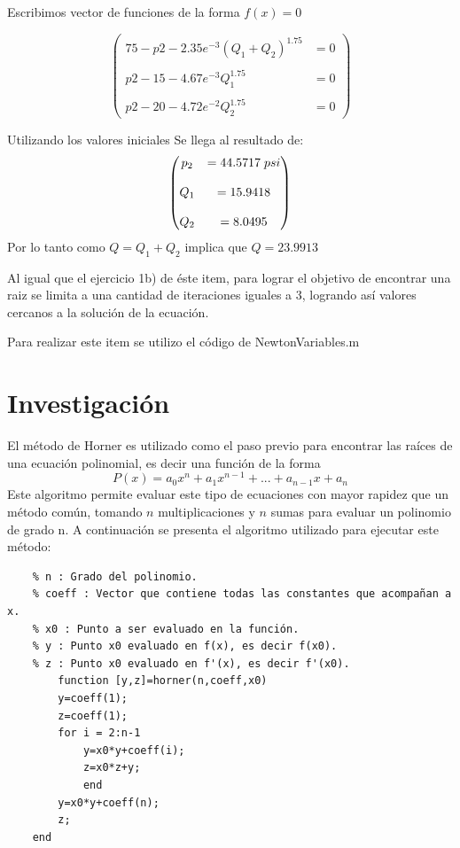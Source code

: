 \documentclass{udpreport}
\begin{document}
\begin{enumerate}
    Escribimos vector de funciones de la forma $f(x) = 0$

   $$\begin{pmatrix}
        75 - p2 - 2.35e^{-3}(Q_1+Q_2)^{1.75} &= 0 \\
        \\
        p2 - 15 - 4.67e^{-3}Q_1^{1.75} &= 0  \\
        \\
        p2 - 20 - 4.72e^{-2}Q_2^{1.75} &= 0
    \end{pmatrix}$$
    
    Utilizando los valores iniciales Se llega al resultado de: 
    $$\begin{pmatrix}
        p_2 &=44.5717 \hspace{0.1cm} psi \\
        \\
        Q_1 &=15.9418 \\
        \\
        Q_2 &=8.0495
    \end{pmatrix}$$
    Por lo tanto como $Q = Q_1 + Q_2 $ implica que $ Q = 23.9913 $
    
    Al igual que el ejercicio 1b) de éste item, para lograr el objetivo de encontrar una raiz se limita a una cantidad de iteraciones iguales a 3, logrando así valores cercanos a la solución de la ecuación.
    
    Para realizar este item se utilizo el código de NewtonVariables.m
    \end{enumerate}
    \newpage
    \chapter{Investigación}
    El método de Horner es utilizado como el paso previo para encontrar las raíces de una ecuación polinomial, es decir una función de la forma $$P(x)=a_{0}x^{n}+a_{1}x^{n-1}+...+a_{n-1}x+a_{n}$$
    Este algoritmo permite evaluar este tipo de ecuaciones con mayor rapidez que un método común, tomando $n$ multiplicaciones y $n$ sumas para evaluar un polinomio de grado n.
   A continuación se presenta el algoritmo utilizado para ejecutar este método:\\
    \begin{lstlisting}
	% n : Grado del polinomio.
	% coeff : Vector que contiene todas las constantes que acompañan a x.
	% x0 : Punto a ser evaluado en la función.
	% y : Punto x0 evaluado en f(x), es decir f(x0).
	% z : Punto x0 evaluado en f'(x), es decir f'(x0).
    	function [y,z]=horner(n,coeff,x0)
		y=coeff(1);
		z=coeff(1);
   	 	for i = 2:n-1
			y=x0*y+coeff(i);
			z=x0*z+y;
    		end
		y=x0*y+coeff(n);
		z;
	end
    \end{lstlisting}
    
\end{document}
